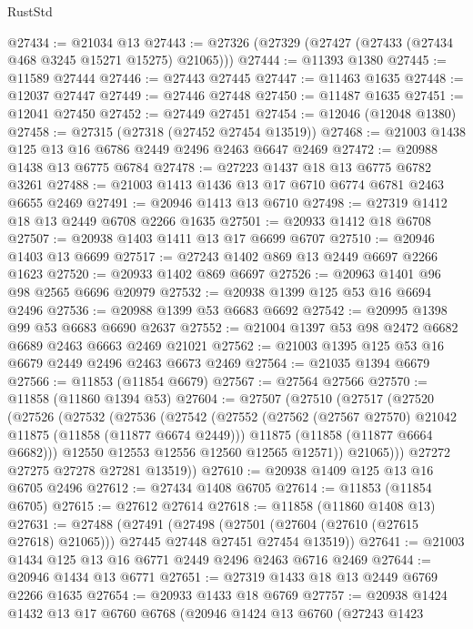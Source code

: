 \begin{lexlean}{RustStd}
\begin{coremodule}
@27434 := @21034 @13
@27443 := @27326 (@27329 (@27427 (@27433 (@27434 @468 @3245 @15271 @15275) @21065)))
@27444 := @11393 @1380
@27445 := @11589 @27444
@27446 := @27443 @27445
@27447 := @11463 @1635
@27448 := @12037 @27447
@27449 := @27446 @27448
@27450 := @11487 @1635
@27451 := @12041 @27450
@27452 := @27449 @27451
@27454 := @12046 (@12048 @1380)
@27458 := @27315 (@27318 (@27452 @27454 @13519))
@27468 := @21003 @1438 @125 @13 @16 @6786 @2449 @2496 @2463 @6647 @2469
@27472 := @20988 @1438 @13 @6775 @6784
@27478 := @27223 @1437 @18 @13 @6775 @6782 @3261
@27488 := @21003 @1413 @1436 @13 @17 @6710 @6774 @6781 @2463 @6655 @2469
@27491 := @20946 @1413 @13 @6710
@27498 := @27319 @1412 @18 @13 @2449 @6708 @2266 @1635
@27501 := @20933 @1412 @18 @6708
@27507 := @20938 @1403 @1411 @13 @17 @6699 @6707
@27510 := @20946 @1403 @13 @6699
@27517 := @27243 @1402 @869 @13 @2449 @6697 @2266 @1623
@27520 := @20933 @1402 @869 @6697
@27526 := @20963 @1401 @96 @98 @2565 @6696 @20979
@27532 := @20938 @1399 @125 @53 @16 @6694 @2496
@27536 := @20988 @1399 @53 @6683 @6692
@27542 := @20995 @1398 @99 @53 @6683 @6690 @2637
@27552 := @21004 @1397 @53 @98 @2472 @6682 @6689 @2463 @6663 @2469 @21021
@27562 := @21003 @1395 @125 @53 @16 @6679 @2449 @2496 @2463 @6673 @2469
@27564 := @21035 @1394 @6679
@27566 := @11853 (@11854 @6679)
@27567 := @27564 @27566
@27570 := @11858 (@11860 @1394 @53)
@27604 := @27507
    (@27510
      (@27517
        (@27520
          (@27526
            (@27532
              (@27536
                (@27542
                  (@27552
                    (@27562 (@27567 @27570) @21042 @11875 (@11858 (@11877 @6674 @2449)))
                    @11875
                    (@11858 (@11877 @6664 @6682)))
                  @12550
                  @12553
                  @12556
                  @12560
                  @12565
                  @12571))
              @21065)))
        @27272
        @27275
        @27278
        @27281
        @13519))
@27610 := @20938 @1409 @125 @13 @16 @6705 @2496
@27612 := @27434 @1408 @6705
@27614 := @11853 (@11854 @6705)
@27615 := @27612 @27614
@27618 := @11858 (@11860 @1408 @13)
@27631 := @27488
    (@27491
      (@27498 (@27501 (@27604 (@27610 (@27615 @27618) @21065))) @27445 @27448 @27451 @27454 @13519))
@27641 := @21003 @1434 @125 @13 @16 @6771 @2449 @2496 @2463 @6716 @2469
@27644 := @20946 @1434 @13 @6771
@27651 := @27319 @1433 @18 @13 @2449 @6769 @2266 @1635
@27654 := @20933 @1433 @18 @6769
@27757 := @20938
    @1424
    @1432
    @13
    @17
    @6760
    @6768
    (@20946
      @1424
      @13
      @6760
      (@27243
        @1423

\end{coremodule}
\end{lexlean}
